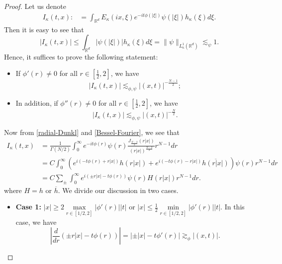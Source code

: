 \documentclass[a4paper,11pt, reqno]{amsart}
\theoremstyle{definition}
\theoremstyle{remark}
\numberwithin{equation}{section}
\begin{document}
	\begin{proof}
		Let us denote
		\begin{align*}
			I_\kappa(t, x):&=\int_{\mathbb{R}^{d}} E_{\kappa}(ix, \xi) e^{-i t\phi(|\xi|)} \psi(|\xi|) h_\kappa(\xi)  d \xi.
		\end{align*}
		Then it is easy to see that
		\begin{equation*}
			\left|I_\kappa(t, x)\right|\leq \int_{\mathbb{R}^{d}} |\psi(|\xi|)| h_\kappa(\xi)  d \xi=\|\psi\|_{L^1_\kappa(\mathbb{R}^{d})}\lesssim_\psi 1.
		\end{equation*}
		Hence, it suffices to prove the following statement: 
        \begin{itemize}
        \item If $\phi'(r)\neq0$ for all $r\in [\frac{1}{2},2]$, we have
		\begin{equation}\label{N-1}
			\left|I_\kappa(t, x)\right|\lesssim_{\phi,\psi} |(x, t)|^{-\frac{N-1}{2}};	\end{equation}
            \item In addition, if $\phi''(r)\neq0$ for all $r\in [\frac{1}{2},2]$, we have
		\begin{equation}\label{N}
			\left|I_\kappa(t, x)\right|\lesssim_{\phi,\psi} |(x, t)|^{-\frac{N}{2}}.
		\end{equation}
        \end{itemize} 
Now from \eqref{radial-Dunkl} and \eqref{Bessel-Fourier}, we see that 
		\begin{align*}
			I_\kappa(t, x)&=\frac{1}{\Gamma(N/2)}\int_0^\infty e^{-it\phi(r)}\psi(r)\frac{J_\frac{N-2}{2}(r|x|)}{\left(r|x|\right)^\frac{N-2}{2}}r^{N-1} dr\\
			&= C \int_0^\infty \left(e^{i(-t\phi(r)+r|x|)}h(r|x|)+e^{i(-t\phi(r)-r|x|)}\overline{h(r|x|)}\right)\psi(r)r^{N-1} dr\\
			&= C \sum_{\pm}\int_0^\infty e^{i\left(\pm r|x|-t\phi(r)\right)}\psi(r)H(r|x|)r^{N-1}dr.
		\end{align*}
		where $H=h$ or $\overline{h}$. We divide our discussion in two cases.
		\begin{itemize}
			\item \textbf{Case 1:} $|x|\geq 2\max\limits_{r\in[1/2,2]}|\phi'(r)||t|$ or $|x|\leq \frac{1}{2}\min\limits_{r\in[1/2,2]}|\phi'(r)||t|$. In this case, we have
			\begin{equation*}
				\left|\frac{d}{dr}\left(\pm r|x|-t\phi(r)\right)\right|=\left|\pm |x|-t\phi'(r)\right|\gtrsim_{\phi} |(x,t)|.
			\end{equation*}

\end{itemize}
\end{proof}
\end{document}
